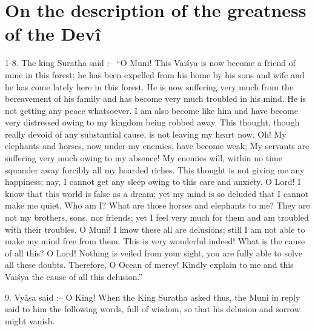 ﻿\chapter{On the description of the greatness of the Dev\^i}

1-8. The king Suratha said :-- ``O Muni! This Vai\'sya is now become a friend of mine in this forest; he has been expelled from his home by his sons and wife and he has come lately here in this forest. He is now suffering very much from the bereavement of his family and has become very much troubled in his mind. He is not getting any peace whatsoever. I am also become like him and have become very distressed owing to my kingdom being robbed away. This thought, though really devoid of any substantial cause, is not leaving my heart now. Oh! My elephants and horses, now under my enemies, have become weak; My servants are suffering very much owing to my absence! My enemies will, within no time squander away forcibly all my hoarded riches. This thought is not giving me any happiness; nay, I cannot get any sleep owing to this care and anxiety. O Lord! I know that this world is false as a dream; yet my mind is so deluded that I cannot make me quiet. Who am I? What are those horses and elephants to me? They are not my brothers, sons, nor friends; yet I feel very much for them and am troubled with their troubles. O Muni! I know these all are delusions; still I am not able to make my mind free from them. This is very wonderful indeed! What is the cause of all this? O Lord! Nothing is veiled from your sight, you are fully able to solve all these doubts. Therefore, O Ocean of mercy! Kindly explain to me and this Vai\'sya the cause of all this delusion.''

9. Vy\^asa said :-- O King! When the King Suratha asked thus, the Muni in reply said to him the following words, full of wisdom, so that his delusion and sorrow might vanish.

